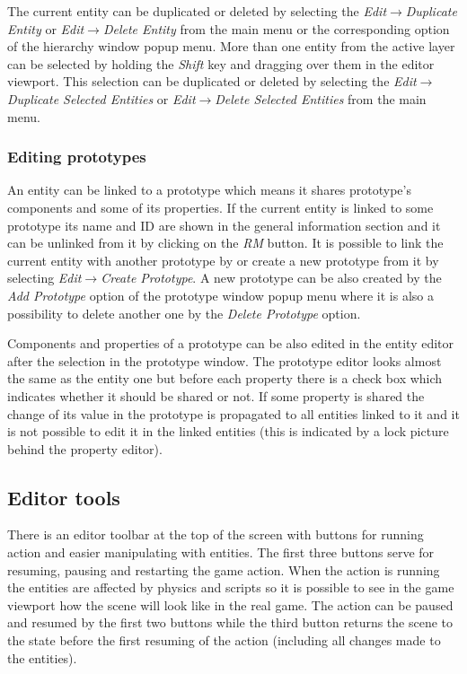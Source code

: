 The current entity can be duplicated or deleted by selecting the \emph{Edit}$\rightarrow$\emph{Du\-pli\-ca\-te Entity} or \emph{Edit}$\rightarrow$\emph{Delete Entity} from the main menu or the corresponding option of the hierarchy window popup menu. More than one entity from the active layer can be selected by holding the \emph{Shift} key and dragging over them in the editor viewport. This selection can be duplicated or deleted by selecting the \emph{Edit}$\rightarrow$\emph{Duplicate Selected Entities} or \emph{Edit}$\rightarrow$\emph{Delete Selected Entities} from the main menu.

\subsubsection{Editing prototypes}
\label{subsub:editor-prototypes}

An entity can be linked to a prototype which means it shares prototype's components and some of its properties. If the current entity is linked to some prototype its name and ID are shown in the general information section and it can be unlinked from it by clicking on the \emph{RM} button. It is possible to link the current entity with another prototype by %
or create a new prototype from it by selecting \emph{Edit}$\rightarrow$\emph{Create Prototype}. A new prototype can be also created by the \emph{Add Prototype} option of the prototype window popup menu where it is also a possibility to delete another one by the \emph{Delete Prototype} option.

Components and properties of a prototype can be also edited in the entity editor after the selection in the prototype window. The prototype editor looks almost the same as the entity one but before each property there is a check box which indicates whether it should be shared or not. If some property is shared the change of its value in the prototype is propagated to all entities linked to it and it is not possible to edit it in the linked entities (this is indicated by a lock picture behind the property editor).

\subsection{Editor tools}
\label{sub:editor-tools}

There is an editor toolbar at the top of the screen with buttons for running action and easier manipulating with entities. The first three buttons serve for resuming, pausing and restarting the game action. When the action is running the entities are affected by physics and scripts so it is possible to see in the game viewport how the scene will look like in the real game. The action can be paused and resumed by the first two buttons while the third button returns the scene to the state before the first resuming of the action (including all changes made to the entities).

